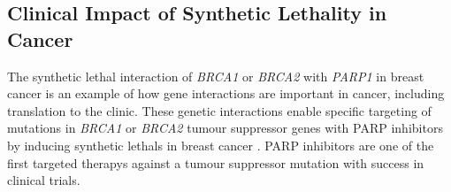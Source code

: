 \subsection{Clinical Impact of Synthetic Lethality in Cancer}



The \gls{synthetic lethal} interaction of \textit{BRCA1} or \textit{BRCA2} with \textit{PARP1} in breast cancer is an example of how gene interactions are important in cancer, including translation to the clinic. These genetic interactions enable specific targeting of \glspl{mutation} in \textit{BRCA1} or \textit{BRCA2} \gls{tumour suppressor} genes with \gls{PARP} inhibitors by inducing \glspl{synthetic lethal} in breast cancer \citep{Farmer2005}. \gls{PARP} inhibitors are one of the first \glspl{targeted therapy} against a \gls{tumour suppressor} \gls{mutation} with success in clinical trials. 

